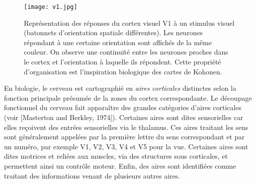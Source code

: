 \documentclass[../main]{subfiles}
\begin{document}
\begin{figure}
\centering
\texttt{[image: v1.jpg]}
\caption{Représentation des réponses du cortex visuel V1 à un stimulus visuel (batonnets d'orientation spatiale différentes). Les neurones répondant à une certaine orientation sont affichés de la même couleur. On observe une continuité entre les neurones proches dans le cortex et l'orientation à laquelle ils répondent. Cette propriété d'organisation est l'inspiration biologique des cartes de Kohonen.}
\label{fig:v1}
\end{figure}

En biologie, le cerveau est cartographié en \emph{aires corticales} distinctes selon la fonction principale présumée de la zones du cortex correspondante.
Le découpage fonctionnel du cerveau fait apparaître des grandes catégories d'aires corticales (voir [Masterton and Berkley, 1974]). Certaines aires sont dites sensorielles car elles reçoivent des entrées sensorielles via le thalamus. Ces aires traitant les sens sont généralement appelées par la première lettre du sens correspondant et par un numéro, par exemple V1, V2, V3, V4 et V5 pour la vue. Certaines aires sont dites motrices et reliées aux muscles, via des structures sous corticales, et permettent ainsi un contrôle moteur.
Enfin, des aires sont identifiées comme traitant des informations venant de plusieurs autres aires.
\end{document}
